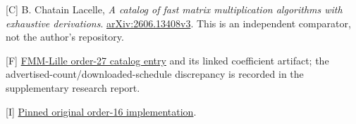 \documentclass[
  11pt,
]{article}
\begin{document}
{[}C{]} B. Chatain Lacelle, \emph{A catalog of fast matrix
multiplication algorithms with exhaustive derivations}.
\href{https://arxiv.org/abs/2606.13408v3}{arXiv:2606.13408v3}. This is
an independent comparator, not the author's repository.

{[}F{]} \href{https://fmm.univ-lille.fr/27x27x27.html}{FMM-Lille
order-27 catalog entry} and its linked coefficient artifact; the
advertised-count/downloaded-schedule discrepancy is recorded in the
supplementary research report.

{[}I{]}
\href{https://github.com/spicylemonade/faster_16x16/blob/7743ee6848ed876615012c4edb3bc46a1f870afd/main.py}{Pinned
original order-16 implementation}.
\end{document}
